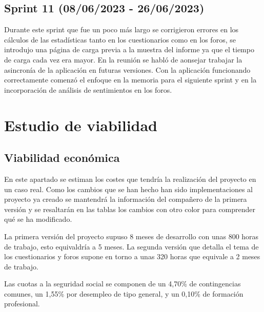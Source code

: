  \subsection{Sprint 11 (08/06/2023 - 26/06/2023)}
	Durante este sprint que fue un poco más largo se corrigieron errores en los cálculos de las estadísticas tanto en los cuestionarios como en los foros, se introdujo una página de carga previa a la muestra del informe ya que el tiempo de carga cada vez era mayor. En la reunión se habló de aonsejar trabajar la asincronía de la aplicación en futuras versiones. Con la aplicación funcionando correctamente comenzó el enfoque en la memoria para el siguiente sprint y en la incorporación de análisis de sentimientos en los foros.

\section{Estudio de viabilidad}

\subsection{Viabilidad económica}
En este apartado se estiman los costes que tendría la realización del proyecto en un caso real. Como los cambios que se han hecho han sido implementaciones al proyecto ya creado se mantendrá la información del compañero de la primera versión\cite{previotfganexos} y se resaltarán en las tablas los cambios con otro color para comprender qué se ha modificado.

La primera versión del proyecto supuso 8 meses de desarrollo con unas 800 horas de trabajo, esto equivaldría a 5 meses. La segunda versión que detalla el tema de los cuestionarios y foros supone en torno a unas 320 horas que equivale a 2 meses de trabajo.
\begin{table}[H]
	\centering
	\caption{Costes de personal}
\end{table}
Las cuotas a la seguridad social se componen de un 4,70\% de contingencias comunes, un 1,55\% por desempleo de tipo general, y un 0,10\% de formación profesional.


